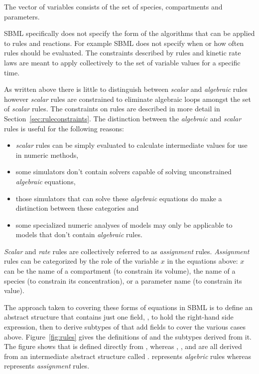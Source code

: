 \documentclass[10pt,twocolumntoc]{cekarticle}
\newcommand{\vref}[1]{\ref{#1}}
\begin{document}
The vector of variables consists of the set of species,
compartments and parameters.  

SBML specifically does not specify the form of the algorithms that can be applied to rules and reactions.  For example SBML does not specify when or how often rules should be evaluated.  The constraints described by rules and kinetic rate laws are meant to apply collectively to the set of variable values for a specific time.

As written above there is little to distinguish between \emph{scalar} and \emph{algebraic} rules however \emph{scalar} rules are constrained to eliminate algebraic loops amongst the set of \emph{scalar} rules. The constraints on rules are described in more detail in Section~\ref{sec:ruleconstraints}. The distinction between the 
\emph{algebraic} and \emph{scalar} rules is useful for the following reasons:
\begin{itemize}
\item \emph{scalar} rules can be simply evaluated to calculate intermediate values for use in numeric methods,
\item some simulators don't contain solvers capable of solving unconstrained \emph{algebraic} equations,
\item those simulators that can solve these \emph{algebraic} equations do make
a distinction between these categories and
\item some specialized numeric analyses of models may only be applicable to models that don't contain \emph{algebraic} rules.
\end{itemize}

\emph{Scalar} and \emph{rate} rules are collectively referred to as \emph{assignment} rules.  \emph{Assignment} rules can be categorized by the role of the variable $x$ in the
equations above: $x$ can be the name of a compartment (to
constrain its volume), the name of a species (to constrain its
concentration), or a parameter name (to constrain its value).

The approach taken to covering these forms of equations in SBML is to define an
abstract  structure that contains just one field,
, to hold the right-hand side expression, then to
derive subtypes of  that add fields to cover the
various cases above. Figure~\vref{fig:rules} gives the definitions
of  and the subtypes derived from it.  The figure
shows that  is defined directly from
, whereas ,
, and  are
all derived from an intermediate abstract structure called
.   represents \emph{algebric} rules whereas  represents \emph{assignment} rules.
\end{document}
